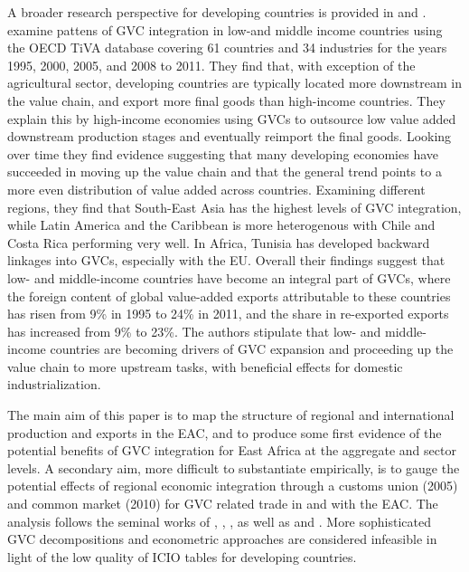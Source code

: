 \documentclass[a4paper]{article}
\begin{document}
A broader research perspective for developing countries is provided in \citet{Kummritz20162} and \citet{Kummritz20161}. \citet{Kummritz20162} examine pattens of GVC integration in low-and middle income countries using the OECD TiVA database covering 61 countries and 34 industries for the years 1995, 2000, 2005, and 2008 to 2011. They find that, with exception of the agricultural sector, developing countries are typically located more downstream in the value chain, and export more final goods than high-income countries. They explain this by high-income economies using GVCs to outsource low value added downstream production stages and eventually reimport the final goods. Looking over time they find evidence suggesting that many developing economies have succeeded in moving up the value chain and that the general trend points to a more even distribution of value added across countries. Examining different regions, they find that South-East Asia has the highest levels of GVC integration, while Latin America and the Caribbean is more heterogenous with Chile and Costa Rica performing very well. In Africa, Tunisia has developed backward linkages into GVCs, especially with the EU. Overall their findings suggest that low- and middle-income countries have become an integral part of GVCs, where the foreign content of global value-added exports attributable to these countries has risen from 9\% in 1995 to 24\% in 2011, and the share in re-exported exports has increased from 9\% to 23\%. The authors stipulate that low- and middle-income countries are becoming drivers of GVC expansion and proceeding up the value chain to more upstream tasks, with beneficial effects for domestic industrialization. \newline



The main aim of this paper is to map the structure of regional and international production and exports in the EAC, and to produce some first evidence of the potential benefits of GVC integration for East Africa at the aggregate and sector levels. A secondary aim, more difficult to substantiate empirically, is to gauge the potential effects of regional economic integration through a customs union (2005) and common market (2010) for GVC related trade in and with the EAC.   %
The analysis follows the seminal works of \citet{hummels2001nature}, \citet{koopman2014tracing}, \citet{wang2013quantifying}, as well as \citet{Kummritz20161} and \citet{Kummritz20162}. More sophisticated GVC decompositions and econometric approaches are considered infeasible in light of the low quality of ICIO tables for developing countries. 
\end{document}
